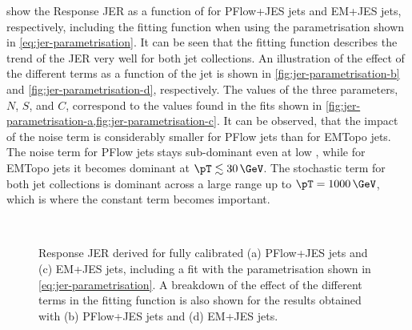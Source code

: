  show the Response JER as a function of \pTtruth for PFlow+JES jets and EM+JES jets, respectively, including the fitting function when using the parametrisation shown in \cref{eq:jer-parametrisation}. It can be seen that the fitting function describes the trend of the JER very well for both jet collections.
An illustration of the effect of the different terms as a function of the jet \pT is shown in \cref{fig:jer-parametrisation-b} and \cref{fig:jer-parametrisation-d}, respectively. The values of the three parameters, $N$, $S$, and $C$, correspond to the values found in the fits shown in \cref{fig:jer-parametrisation-a,fig:jer-parametrisation-c}.
It can be observed, that the impact of the noise term is considerably smaller for PFlow jets than for EMTopo jets.
The noise term for PFlow jets stays sub-dominant even at low \pT, while for EMTopo jets it becomes dominant at $\pT \lesssim 30\,\GeV$. The stochastic term for both jet collections is dominant across a large \pT range up to $\pT = 1000\,\GeV$, which is where the constant term becomes important.



\begin{figure}[t]
     \\
    \caption[Response JER derived for fully calibrated jets.]{Response JER derived for fully calibrated (a) PFlow+JES jets and (c) EM+JES jets, including a fit with the parametrisation shown in \cref{eq:jer-parametrisation}. A breakdown of the effect of the different terms in the fitting function is also shown for the results obtained with (b) PFlow+JES jets and (d) EM+JES jets.}
    \label{fig:jer-parametrisation}
\end{figure}


